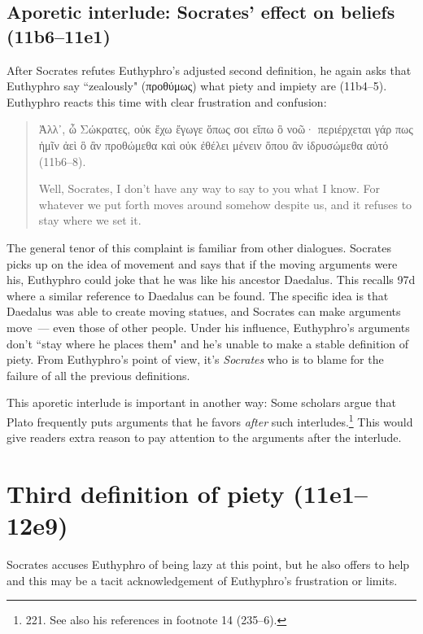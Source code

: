 \documentclass[11pt]{article}
\begin{document}
\subsection{Aporetic interlude: Socrates' effect on beliefs (11b6--11e1)}

After Socrates refutes Euthyphro's adjusted second definition, he again asks that Euthyphro say ``zealously" (προθύμως) what piety and impiety are (11b4--5).  Euthyphro reacts this time with clear frustration and confusion:

\begin{quote}
    Ἀλλ᾽, ὦ Σώκρατες, οὐκ ἔχω ἔγωγε ὅπως σοι εἴπω ὃ νοῶ· περιέρχεται γάρ πως ἡμῖν ἀεὶ ὃ ἂν προθώμεθα καὶ οὐκ ἐθέλει μένειν ὅπου ἂν ἱδρυσώμεθα αὐτό (11b6--8).

    Well, Socrates, I don't have any way to say to you what I know. For whatever we put forth moves around somehow despite us, and it refuses to stay where we set it.
\end{quote}

The general tenor of this complaint is familiar from other dialogues.  Socrates picks up on the idea of movement and says that if the moving arguments were his, Euthyphro could joke that he was like his ancestor Daedalus.  This recalls  97d where a similar reference to Daedalus can be found.  The specific idea is that Daedalus was able to create moving statues, and Socrates can make arguments move~--- even those of other people.  Under his influence, Euthyphro's arguments don't ``stay where he places them" and he's unable to make a stable definition of piety.  From Euthyphro's point of view, it's \emph{Socrates} who is to blame for the failure of all the previous definitions.

This aporetic interlude is important in another way: Some scholars argue that Plato frequently puts arguments that he favors \emph{after} such interludes.\footnote{\citet{mcpherran1992} 221.  See also his references in footnote 14 (235--6).}  This would give readers extra reason to pay attention to the arguments after the interlude.

\section{Third definition of piety (11e1--12e9)}

Socrates accuses Euthyphro of being lazy at this point, but he also offers to help and this may be a tacit acknowledgement of Euthyphro's frustration or limits.
\end{document}
